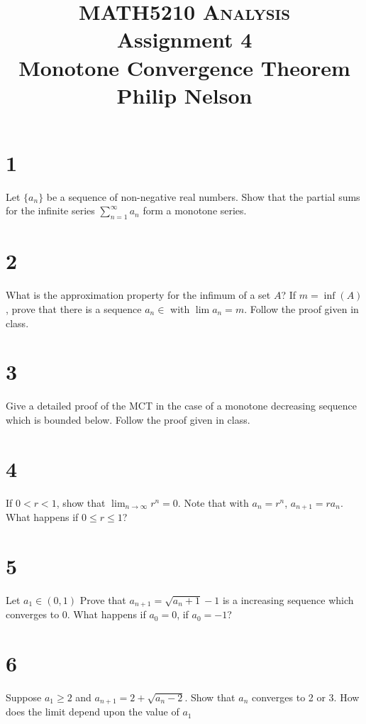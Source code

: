 \documentclass[10pt,letterpaper]{article}
\newcommand\ds{\displaystyle}
\begin{document}
\title{MATH5210 \textsc{Analysis}
  \\ Assignment 4
  \\ Monotone Convergence Theorem
  \\ Philip Nelson
}

\date{}

\maketitle

\section*{1} Let $\{a_n\}$ be a sequence of non-negative real numbers. Show that the partial sums for the infinite series $\ds \sum_{n=1}^{\infty } a_n$ form a monotone series.

\section*{2} What is the approximation property for the infimum of a set $A$? If $m = \inf(A)$, prove that there is a sequence $a_n \in $ with $\lim a_n = m$. Follow the proof given in class.

\section*{3} Give a detailed proof of the MCT in the case of a monotone decreasing sequence which is bounded below. Follow the proof given in class.

\section*{4} If $0 < r < 1$, show that $\ds \lim_{n \to \infty} r^n= 0$. Note that with $a_n = r^n$, $a_{n+1} = r a_n$. What happens if $0 \leq r \leq 1$?

\section*{5} Let $a_1 \in (0, 1)$ Prove that $a_{n+1} = \sqrt{a_{n} +1} -1 $ is a increasing sequence which converges to 0. What happens if $a_0 = 0$, if $a_0 = -1$?

\section*{6} Suppose $a_1 \geq 2$ and $a_{n +1} = 2 + \sqrt{a_n - 2}$. Show that $a_n$ converges to 2 or 3. How does the limit depend upon the value of $a_1$
\end{document}

